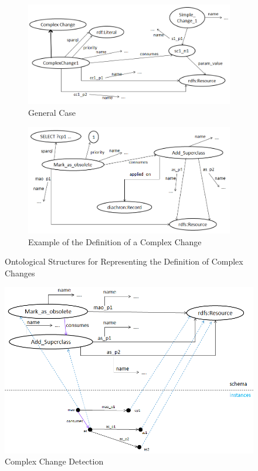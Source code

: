 \begin{figure} [t]
	\centering
    \begin{subfigure}[b]{0.7\textwidth}
		\includegraphics[width=\textwidth]{figures/Slide7.PNG}
	    \caption{General Case}
        \label{fig:cc example}
    \end{subfigure}
        \begin{subfigure}[b]{0.7\textwidth}
        \includegraphics[width=\textwidth]{figures/Slide8.PNG}
        \caption{Example of the Definition of a Complex Change}
        \label{fig:cc_definition}
	\end{subfigure}
    \caption{Ontological Structures for Representing the Definition of Complex Changes}
    \label{fig:comchan}
\end{figure}

\begin{figure}[t]
\centering
\includegraphics[width=120mm]{figures/Slide9.PNG}
\caption{Complex Change Detection}
\label{fig:cc detection}
\end{figure}

